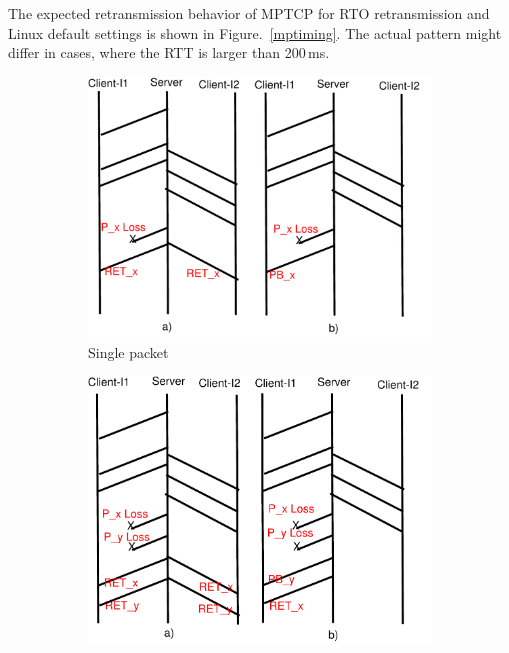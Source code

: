 \documentclass[10pt,conference,compsoc]{IEEEtran}
\begin{document}
The expected retransmission behavior of MPTCP for RTO retransmission and Linux default settings is shown 
in Figure.~\ref{mptiming}. The actual pattern might differ in cases, where the RTT is larger than 200\,ms. 
\renewcommand{\thesubfigure}{\roman{subfigure}}
\begin{figure}[!tbp]
 \begin{subfigure}[b]{0.32\textwidth}
	\includegraphics[angle=0, width=\textwidth, natwidth=610, natheight=400]{images/timing1P.pdf}
	\caption{Single packet}\label{timing1P}
 \end{subfigure}
 \hfill
 \begin{subfigure}[b]{0.32\textwidth} 
	\includegraphics[angle=0, width=\textwidth, natwidth=610, natheight=400]{images/timing2P.pdf}

\end{subfigure}
\end{figure}
\end{document}
